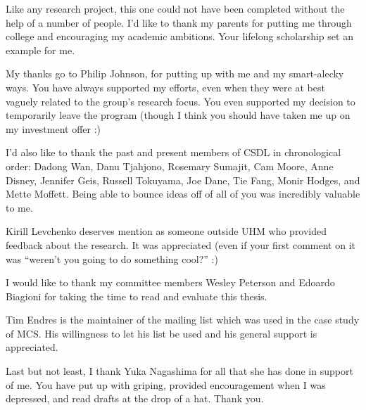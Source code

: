 
\begin{acknowledgments}

  Like any research project, this one could not have been completed without the
  help of a number of people. I'd like to thank my parents for putting me
  through college and encouraging my academic ambitions. Your lifelong
  scholarship set an example for me.
  
  My thanks go to Philip Johnson, for putting up with me and my smart-alecky
  ways. You have always supported my efforts, even when they were at best
  vaguely related to the group's research focus. You even supported my decision
  to temporarily leave the program (though I think you should have taken me up
  on my investment offer :)
  
  I'd also like to thank the past and present members of CSDL in chronological
  order: Dadong Wan, Danu Tjahjono, Rosemary Sumajit, Cam Moore, Anne Disney,
  Jennifer Geis, Russell Tokuyama, Joe Dane, Tie Fang, Monir Hodges, and Mette
  Moffett. Being able to bounce ideas off of all of you was incredibly valuable
  to me.
  
  Kirill Levchenko deserves mention as someone outside UHM who provided
  feedback about the research. It was appreciated (even if your first comment
  on it was ``weren't you going to do something cool?'' :)
  
  I would like to thank my committee members Wesley Peterson and Edoardo
  Biagioni for taking the time to read and evaluate this thesis.
  
  Tim Endres is the maintainer of the mailing list which was used in the case
  study of MCS. His willingness to let his list be used and his general support
  is appreciated.
  
  Last but not least, I thank Yuka Nagashima for all that she has done in
  support of me. You have put up with griping, provided encouragement when I
  was depressed, and read drafts at the drop of a hat. Thank you.

\end{acknowledgments}
